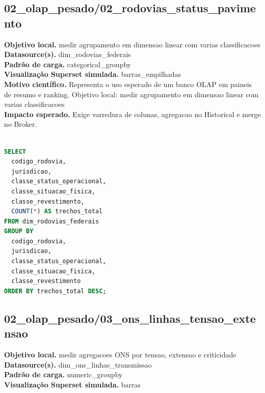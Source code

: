 \documentclass[11pt,a4paper]{article}
\begin{document}
\subsection{02\_olap\_pesado/02\_rodovias\_status\_pavimento}

\textbf{Objetivo local.} medir agrupamento em dimensao linear com varias classificacoes\\

\textbf{Datasource(s).} dim\_rodovias\_federais\\

\textbf{Padrão de carga.} categorical\_groupby\\

\textbf{Visualização Superset simulada.} barras\_empilhadas\\

\textbf{Motivo científico.} Representa o uso esperado de um banco OLAP em paineis de resumo e ranking. Objetivo local: medir agrupamento em dimensao linear com varias classificacoes\\

\textbf{Impacto esperado.} Exige varredura de colunas, agregacao no Historical e merge no Broker.

\begin{lstlisting}[language=SQL]

SELECT
  codigo_rodovia,
  jurisdicao,
  classe_status_operacional,
  classe_situacao_fisica,
  classe_revestimento,
  COUNT(*) AS trechos_total
FROM dim_rodovias_federais
GROUP BY
  codigo_rodovia,
  jurisdicao,
  classe_status_operacional,
  classe_situacao_fisica,
  classe_revestimento
ORDER BY trechos_total DESC;

\end{lstlisting}

\subsection{02\_olap\_pesado/03\_ons\_linhas\_tensao\_extensao}

\textbf{Objetivo local.} medir agregacoes ONS por tensao, extensao e criticidade\\

\textbf{Datasource(s).} dim\_ons\_linhas\_transmissao\\

\textbf{Padrão de carga.} numeric\_groupby\\

\textbf{Visualização Superset simulada.} barras\\
\end{document}
